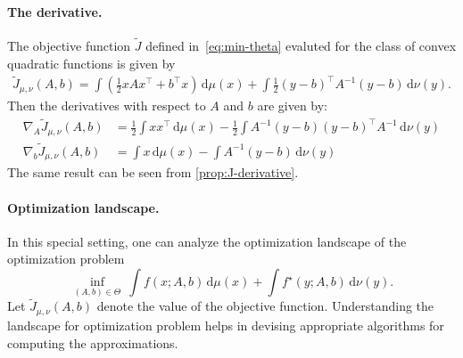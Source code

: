 \documentclass[10pt]{article}
\newcommand{\ud}{\,\mathrm{d}}
\renewcommand{\tilde}{\widetilde}
\numberwithin{equation}{section}
\begin{document}
\paragraph{The derivative.} 
The objective function $\tilde{J}$ defined in~\eqref{eq:min-theta} evaluted for the class of convex quadratic functions is given by 
\begin{align}\label{eq:J-quad}
\tilde{J}_{\mu,\nu}(A,b) = \int (\frac{1}{2}xAx^\top +b^\top x)\ud \mu(x) + \int \frac{1}{2}(y-b)^\top A^{-1}(y-b)\ud \nu(y).
\end{align}
Then the derivatives with respect to $A$ and $b$ are given by:
\begin{align*}
\nabla_A \tilde{J}_{\mu,\nu}(A,b) &= \frac{1}{2} \int x x^\top \ud \mu(x) - \frac{1}{2}\int A^{-1}(y-b)(y-b)^\top A^{-1} \ud \nu(y)\\
\nabla_b \tilde{J}_{\mu,\nu}(A,b) &= \int x \ud \mu(x) - \int A^{-1}(y-b) \ud \nu(y)
\end{align*}
The same result can be seen from \autoref{prop:J-derivative}. 


\paragraph{Optimization landscape.} 
In this special setting, one can analyze the optimization landscape of the optimization problem 
\begin{equation}\label{eq:opt-problem-quadratic}
\inf_{(A,b) \in \Theta}~\int f(x;A,b)\ud \mu(x) + \int f^\star(y;A,b)\ud \nu(y).
\end{equation}
Let $\tilde{J}_{\mu,\nu}(A,b)$ denote the value of the objective function. 
Understanding the landscape for optimization problem helps in devising appropriate algorithms for computing the approximations. 
\end{document}
